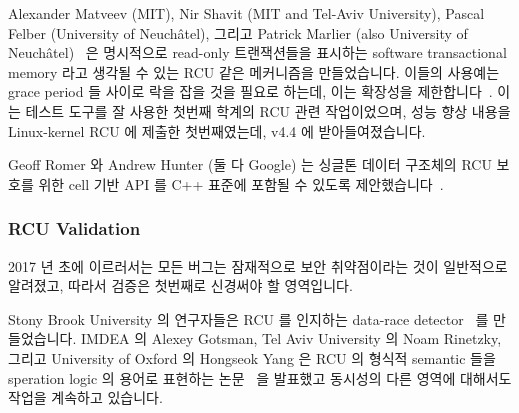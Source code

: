 Alexander Matveev (MIT), Nir Shavit (MIT and Tel-Aviv University),
Pascal Felber (University of Neuch\^{a}tel), 그리고 Patrick Marlier (also
University of Neuch\^{a}tel)~\cite{Matveev:2015:RLS:2815400.2815406}
은 명시적으로 read-only 트랜잭션들을 표시하는 software transactional memory
라고 생각될 수 있는 RCU 같은 메커니즘을 만들었습니다.
이들의 사용예는 grace period 들 사이로 락을 잡을 것을 필요로 하는데, 이는
확장성을
제한합니다~\cite{PaulEMcKenney2015ReadMostly,PaulEMcKenney2015ReadMostlySidebar}.
이는  테스트 도구를 잘 사용한 첫번째 학계의 RCU 관련
작업이었으며, 성능 향상 내용을 Linux-kernel RCU 에 제출한 첫번째였는데, v4.4 에
받아들여졌습니다.

Geoff Romer 와 Andrew Hunter (둘 다 Google) 는 싱글톤 데이터 구조체의 RCU
보호를 위한 cell 기반 API 를 C++ 표준에 포함될 수 있도록
제안했습니다~\cite{GeoffRomer2017C++DeferredReclamation}.
\iffalse

Alexander Matveev (MIT), Nir Shavit (MIT and Tel-Aviv University),
Pascal Felber (University of Neuch\^{a}tel), and Patrick Marlier (also
University of Neuch\^{a}tel)~\cite{Matveev:2015:RLS:2815400.2815406}
produced an RCU-like mechanism that can be thought of as
software transactional memory that explicitly marks
read-only transactions.
Their use cases require holding locks across grace periods, which limits
scalability~\cite{PaulEMcKenney2015ReadMostly,PaulEMcKenney2015ReadMostlySidebar}.
This appears to be the first academic RCU-related work to
make good use of the \co{rcutorture} test suite, and also the
first to have submitted a performance improvement to Linux-kernel
RCU, which was accepted into v4.4.

Geoff Romer and Andrew Hunter (both at Google) proposed a cell-based API for RCU
protection of singleton data structures for inclusion in the
C++ standard~\cite{GeoffRomer2017C++DeferredReclamation}.
\fi

\subsubsection{RCU Validation}
\label{sec:defer:RCU Validation}

2017 년 초에 이르러서는 모든 버그는 잠재적으로 보안 취약점이라는 것이
일반적으로 알려졌고, 따라서 검증은 첫번째로 신경써야 할 영역입니다.

Stony Brook University 의 연구자들은 RCU 를 인지하는 data-race
detector~\cite{AbhinavDuggal2010Masters,JustinSeyster2012PhD,Seyster:2011:RFA:2075416.2075425}
를 만들었습니다.
IMDEA 의 Alexey Gotsman, Tel Aviv University 의 Noam Rinetzky, 그리고
University of Oxford 의 Hongseok Yang 은 RCU 의 형식적 semantic 들을 speration
logic 의 용어로 표현하는 논문~\cite{AlexeyGotsman2012VerifyGraceExtended} 을
발표했고 동시성의 다른 영역에 대해서도 작업을 계속하고 있습니다.

